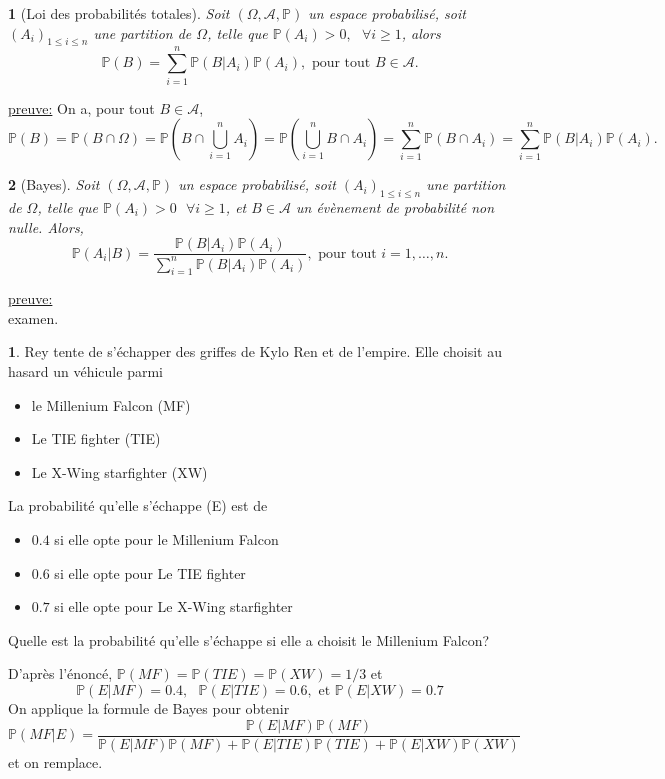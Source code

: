 \documentclass[8pt,notheorems]{beamer}
\def \P {\mathbb P}
\newtheorem{theorem}{\translate{Theorem}}[section]
\newtheorem{theorem}{\translate{Theoreme}}
\theoremstyle{definition}
\theoremstyle{example}
\newtheorem{example}{\translate{Exemple}}
\theoremstyle{mystyle}
\theoremstyle{plain}
\begin{document}
\begin{frame}[allowframebreaks]
\begin{theorem}[Loi des probabilités totales]
Soit $(\Omega, \mathcal{A},\P)$ un espace probabilisé, soit $(A_i)_{1\leq i\leq n}$ une partition de $\Omega$, telle que $\P(A_i)>0,\text{ }\forall i\geq1$, alors 
$$
\P(B) =\sum_{i =1}^{n}\P(B|A_i)\P(A_i),\text{ pour tout }B\in\mathcal{A}.
$$ 
\end{theorem}
\underline{preuve:} On a, pour tout $B\in\mathcal{A}$, 
$$
\P(B)= \P\left(B\cap \Omega\right)=\P\left(B\cap \bigcup_{i = 1}^n A_i\right)=\P\left(\bigcup_{i = 1}^n B\cap  A_i\right) = \sum_{i = 1}^{n}\P(B\cap A_i) =  \sum_{i = 1}^{n}\P(B|A_i)\P(A_i).
$$
\begin{theorem}[Bayes]
Soit $(\Omega, \mathcal{A},\P)$ un espace probabilisé, soit $(A_i)_{1\leq i\leq n}$ une partition de $\Omega$, telle que $\P(A_i)>0\text{ }\forall i\geq1$, et $B\in\mathcal{A}$ un évènement de probabilité non nulle. Alors, 
$$
\P(A_i|B) = \frac{\P(B|A_i)\P(A_i)}{\sum_{i =1}^{n}\P(B|A_i)\P(A_i)},\text{ pour tout }i = 1,\ldots, n.
$$ 
\end{theorem}
\underline{preuve:}\\
examen.
\begin{example}
Rey tente de s'échapper des griffes de Kylo Ren et de l'empire. Elle choisit au hasard un véhicule parmi 
\begin{itemize}
    \item le Millenium Falcon (MF)
    \item Le TIE fighter (TIE)
    \item Le X-Wing starfighter (XW)
\end{itemize}
La probabilité qu'elle s'échappe (E) est de 
\begin{itemize}
    \item $0.4$ si elle opte pour le Millenium Falcon
    \item $0.6$ si elle opte pour Le TIE fighter
    \item $0.7$ si elle opte pour Le X-Wing starfighter
\end{itemize}
Quelle est la probabilité qu'elle s'échappe si elle a choisit le Millenium Falcon?
\end{example}
D'après l'énoncé, $\P(MF) = \P(TIE) = \P(XW) = 1/3$ et 
$$
\P(E|MF) = 0.4,\text{ }\P(E|TIE) = 0.6,\text{ et }\P(E|XW) = 0.7 
$$
On applique la formule de Bayes pour obtenir
$$
\P(MF|E) = \frac{\P(E|MF)\P(MF)}{\P(E|MF)\P(MF)+\P(E|TIE)\P(TIE)+\P(E|XW)\P(XW)}
$$
et on remplace. 
\end{frame} 
\end{document}
